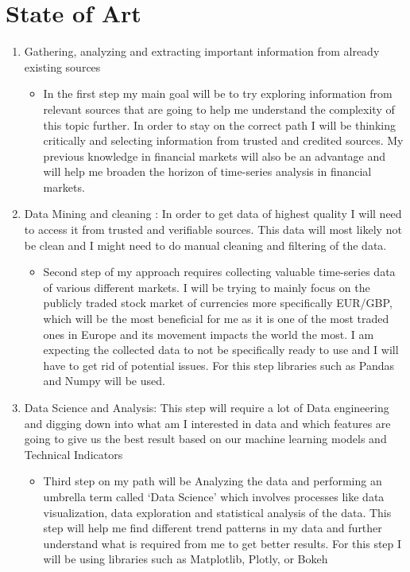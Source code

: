 \documentclass{imc-inf}
\begin{document}
	\section{State of Art}
	\begin{enumerate}
		\item Gathering, analyzing and extracting important information from
		already existing sources
		\begin{itemize}
			\item  In the first step my main goal will be to try exploring information
			from relevant sources that are going to help me understand the complexity of
			this topic further. In order to stay on the correct path I will be thinking critically
			and selecting information from trusted and credited sources. My previous
			knowledge in financial markets will also be an advantage and will help me
			broaden the horizon of time-series analysis in financial markets.
		\end{itemize}
		
		\item Data Mining and cleaning : In order to get data of highest quality I will need
		to access it from trusted and verifiable sources. This data will most likely not
		be clean and I might need to do manual cleaning and filtering of the data.
		\begin{itemize}
			\item Second step of my approach requires collecting valuable time-series data
			of various different markets. I will be trying to mainly focus on the
			publicly traded stock market of currencies more specifically EUR/GBP, which will be the most beneficial for me as it
			is one of the most traded ones in Europe and its movement impacts the world the most. I am
			expecting the collected data to not be specifically ready to use and I will have
			to get rid of potential issues. For this step libraries such as Pandas and Numpy will be used.
		\end{itemize}
		
		\item Data Science and Analysis: This step will require a lot of Data engineering
		and digging down into what am I interested in data and which features are
		going to give us the best result based on our machine learning models and Technical Indicators
		\begin{itemize}
			\item Third step on my path will be Analyzing the data and performing an umbrella
			term called ‘Data Science’ which involves processes like data visualization,
			data exploration and statistical analysis of the data. This step will help me find
			different trend patterns in my data and further understand what is required
			from me to get better results. For this step I will be using libraries such as
			Matplotlib, Plotly, or Bokeh 
		\end{itemize}
		

\end{enumerate}
\end{document}
